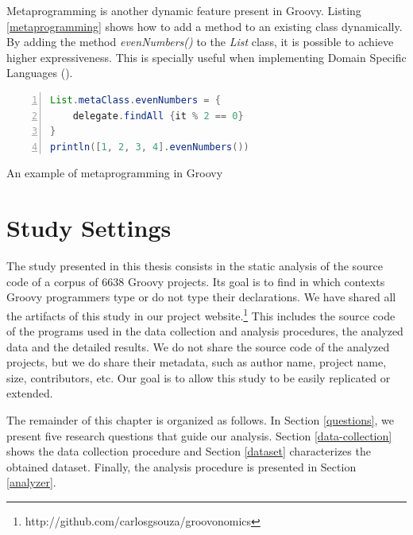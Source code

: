 \documentclass[msc]{ppgccufmg}
\begin{document}
Metaprogramming is another dynamic feature present in Groovy. 
Listing \ref{metaprogramming} shows how to add a method to an existing class dynamically.
By adding the method \emph{evenNumbers()} to the \emph{List} class, it is possible to achieve higher expressiveness.
This is specially useful when implementing Domain Specific Languages (\cite{fowler10}).

\begin{Listing}[ht]
\begin{lstlisting}[basicstyle=\ttfamily, language=Java,tabsize=2,breaklines=true,numbers=left]
List.metaClass.evenNumbers = {
	delegate.findAll {it % 2 == 0}
}
println([1, 2, 3, 4].evenNumbers())

\end{lstlisting}
\caption{An example of metaprogramming in Groovy}
\label{metaprogramming}
\end{Listing}%













%
%
\chapter{Study Settings\label{study-settings}}

The study presented in this thesis consists in the static analysis of the source code of a corpus of 6638 Groovy projects.
Its goal is to find in which contexts Groovy programmers type or do not type their declarations.
We have shared all the artifacts of this study in our project website.\footnote{http://github.com/carlosgsouza/groovonomics}
This includes the source code of the programs used in the data collection and analysis procedures, the analyzed data and the detailed results.
We do not share the source code of the analyzed projects, but we do share their metadata, such as author name, project name, size, contributors, etc.
Our goal is to allow this study to be easily replicated or extended.

The remainder of this chapter is organized as follows.
In Section \ref{questions}, we present five research questions that guide our analysis. 
Section \ref{data-collection} shows the data collection procedure and Section \ref{dataset} characterizes the obtained dataset.
Finally, the analysis procedure is presented in Section \ref{analyzer}.
\end{document}
